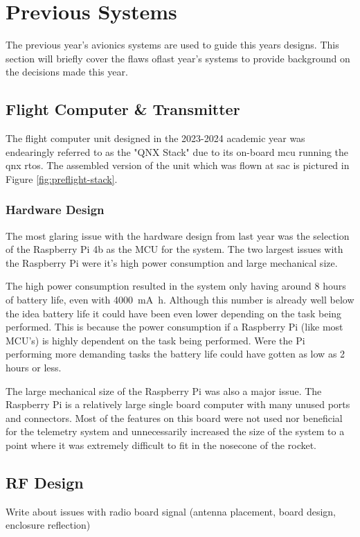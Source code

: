 \section{Previous Systems}

The previous year's avionics systems are used to guide this years designs. This section will briefly cover the flaws oflast year's systems to provide background on the decisions made this year.

\subsection{Flight Computer \& Transmitter}

The flight computer unit designed in the 2023-2024 academic year was endearingly referred to as the "QNX Stack" due to
its on-board \gls{mcu} running the \gls{qnx} \gls{rtos}. The assembled version of the unit which was flown at \gls{sac}
is pictured in Figure \ref{fig:preflight-stack}.

\subsubsection{Hardware Design}

The most glaring issue with the hardware design from last year was the selection of the Raspberry Pi 4b as the MCU for the system. The two largest issues with the Raspberry Pi were it's high power consumption and large mechanical size. 

The high power consumption resulted in the system only having around 8 hours of battery life, even with \qty{4000}{\milli\ampere\hour}. Although this number is already well below the idea battery life it could have been even lower depending on the task being performed. This is because the power consumption if a Raspberry Pi (like most MCU's) is highly dependent on the task being performed. Were the Pi performing more demanding tasks the battery life could have gotten as low as 2 hours or less.

The large mechanical size of the Raspberry Pi was also a major issue. The Raspberry Pi is a relatively large single board computer with many unused ports and connectors. Most of the features on this board were not used nor beneficial for the telemetry system and unnecessarily increased the size of the system to a point where it was extremely difficult to fit in the nosecone of the rocket.



\subsection{RF Design}
Write about issues with radio board signal (antenna placement, board design, enclosure reflection)

